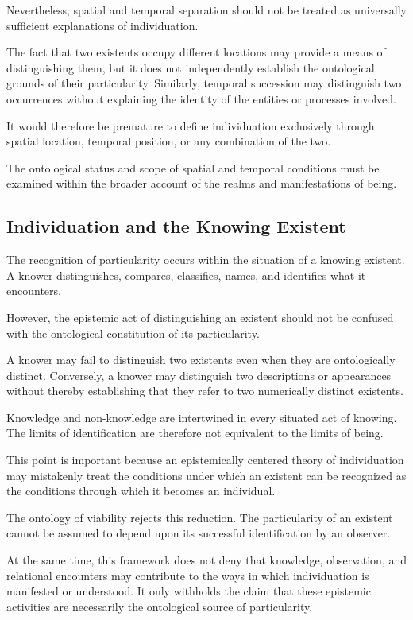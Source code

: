 Nevertheless, spatial and temporal separation should not be treated as universally sufficient explanations of individuation.

The fact that two existents occupy different locations may provide a means of distinguishing them, but it does not independently establish the ontological grounds of their particularity. Similarly, temporal succession may distinguish two occurrences without explaining the identity of the entities or processes involved.

It would therefore be premature to define individuation exclusively through spatial location, temporal position, or any combination of the two.

The ontological status and scope of spatial and temporal conditions must be examined within the broader account of the realms and manifestations of being.

\subsection{Individuation and the Knowing Existent}

The recognition of particularity occurs within the situation of a knowing existent. A knower distinguishes, compares, classifies, names, and identifies what it encounters.

However, the epistemic act of distinguishing an existent should not be confused with the ontological constitution of its particularity.

A knower may fail to distinguish two existents even when they are ontologically distinct. Conversely, a knower may distinguish two descriptions or appearances without thereby establishing that they refer to two numerically distinct existents.

Knowledge and non-knowledge are intertwined in every situated act of knowing. The limits of identification are therefore not equivalent to the limits of being.

This point is important because an epistemically centered theory of individuation may mistakenly treat the conditions under which an existent can be recognized as the conditions through which it becomes an individual.

The ontology of viability rejects this reduction. The particularity of an existent cannot be assumed to depend upon its successful identification by an observer.

At the same time, this framework does not deny that knowledge, observation, and relational encounters may contribute to the ways in which individuation is manifested or understood. It only withholds the claim that these epistemic activities are necessarily the ontological source of particularity.

